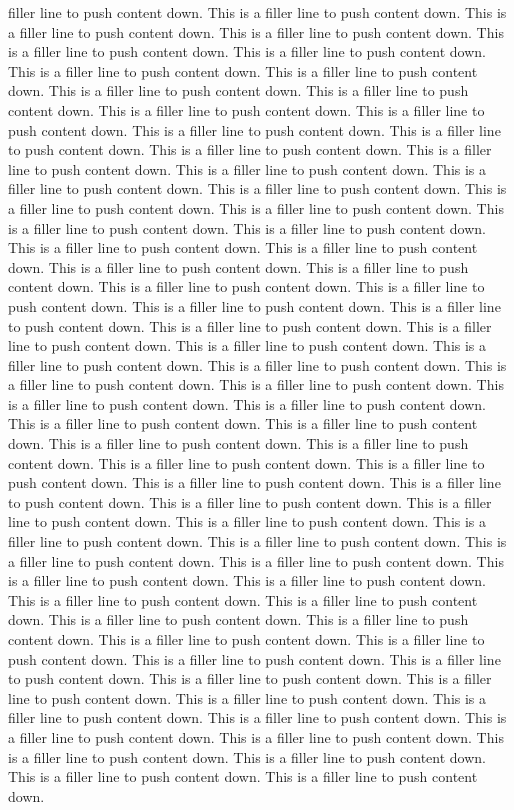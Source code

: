 \documentclass[11pt,a4paper]{report}
\begin{document}
filler line to push content down. This is a filler line to push content down. This is a filler line to push content down. This is a filler line to push content down. This is a filler line to push content down. This is a filler line to push content down. This is a filler line to push content down. This is a filler line to push content down. This is a filler line to push content down. This is a filler line to push content down. This is a filler line to push content down. This is a filler line to push content down. This is a filler line to push content down. This is a filler line to push content down. This is a filler line to push content down. This is a filler line to push content down. This is a filler line to push content down. This is a filler line to push content down. This is a filler line to push content down. This is a filler line to push content down. This is a filler line to push content down. This is a filler line to push content down. This is a filler line to push content down. This is a filler line to push content down. This is a filler line to push content down. This is a filler line to push content down. This is a filler line to push content down. This is a filler line to push content down. This is a filler line to push content down. This is a filler line to push content down. This is a filler line to push content down. This is a filler line to push content down. This is a filler line to push content down. This is a filler line to push content down. This is a filler line to push content down. This is a filler line to push content down. This is a filler line to push content down. This is a filler line to push content down. This is a filler line to push content down. This is a filler line to push content down. This is a filler line to push content down. This is a filler line to push content down. This is a filler line to push content down. This is a filler line to push content down. This is a filler line to push content down. This is a filler line to push content down. This is a filler line to push content down. This is a filler line to push content down. This is a filler line to push content down. This is a filler line to push content down. This is a filler line to push content down. This is a filler line to push content down. This is a filler line to push content down. This is a filler line to push content down. This is a filler line to push content down. This is a filler line to push content down. This is a filler line to push content down. This is a filler line to push content down. This is a filler line to push content down. This is a filler line to push content down. This is a filler line to push content down. This is a filler line to push content down. This is a filler line to push content down. This is a filler line to push content down. This is a filler line to push content down. This is a filler line to push content down. This is a filler line to push content down. This is a filler line to push content down. This is a filler line to push content down. This is a filler line to push content down. This is a filler line to push content down. This is a filler line to push content down. This is a filler line to push content down. This is a filler line to push content down. This is a filler line to push content down. This is a filler line to push content down. 
\end{document}
